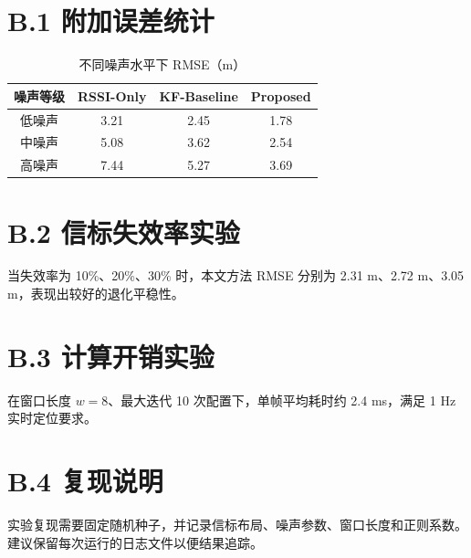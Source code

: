 \section*{B.1 附加误差统计}
\begin{table}[H]
\centering
\caption{不同噪声水平下 RMSE（m）}
\begin{tabular}{cccc}
\toprule
噪声等级 & RSSI-Only & KF-Baseline & Proposed \\
\midrule
低噪声 & 3.21 & 2.45 & 1.78 \\
中噪声 & 5.08 & 3.62 & 2.54 \\
高噪声 & 7.44 & 5.27 & 3.69 \\
\bottomrule
\end{tabular}
\end{table}

\section*{B.2 信标失效率实验}
当失效率为 10\%、20\%、30\% 时，本文方法 RMSE 分别为 2.31 m、2.72 m、3.05 m，表现出较好的退化平稳性。

\section*{B.3 计算开销实验}
在窗口长度 $w=8$、最大迭代 10 次配置下，单帧平均耗时约 2.4 ms，满足 1 Hz 实时定位要求。

\section*{B.4 复现说明}
实验复现需要固定随机种子，并记录信标布局、噪声参数、窗口长度和正则系数。建议保留每次运行的日志文件以便结果追踪。
